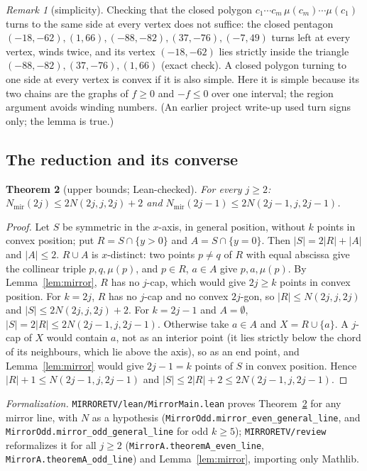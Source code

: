 \documentclass[10pt]{article}
\newtheorem{theorem}{Theorem}[section]
\theoremstyle{definition}
\theoremstyle{remark}
\newtheorem{remark}[theorem]{Remark}
\newcommand{\Nm}{N_{\mathrm{mir}}}
\newcommand{\dirn}[1]{{\upshape\nolinkurl{#1}}}
\newcommand{\lean}[1]{{\upshape\nolinkurl{#1}}}
\begin{document}
\begin{remark}[simplicity]\label{rem:simple}
Checking that the closed polygon $c_1\cdots c_m\,\mu(c_m)\cdots\mu(c_1)$ turns to the same side at every vertex does not
suffice: the closed pentagon $(-18,-62),(1,66),(-88,-82),(37,-76),(-7,49)$ turns left at every vertex, winds twice,
and its vertex $(-18,-62)$ lies strictly inside the triangle $(-88,-82),(37,-76),(1,66)$ (exact check). A closed polygon
turning to one side at every vertex is convex if it is also simple. Here it is simple because its two chains are the
graphs of $f\ge0$ and $-f\le0$ over one interval; the region argument avoids winding numbers. (An earlier project
write-up used turn signs only; the lemma is true.)
\end{remark}

\subsection{The reduction and its converse}

\begin{theorem}[upper bounds; Lean-checked]\label{thm:A}
For every $j\ge2$: $\Nm(2j)\le2N(2j,j,2j)+2$ and $\Nm(2j-1)\le2N(2j-1,j,2j-1)$.
\end{theorem}

\begin{proof}
Let $S$ be symmetric in the $x$-axis, in general position, without $k$ points in convex position; put
$R=S\cap\{y>0\}$ and $A=S\cap\{y=0\}$. Then $|S|=2|R|+|A|$ and $|A|\le2$. $R\cup A$ is $x$-distinct: two points $p\ne q$
of $R$ with equal abscissa give the collinear triple $p,q,\mu(p)$, and $p\in R$, $a\in A$ give $p,a,\mu(p)$. By
Lemma~\ref{lem:mirror}, $R$ has no $j$-cap, which would give $2j\ge k$ points in convex position. For $k=2j$, $R$ has no
$j$-cap and no convex $2j$-gon, so $|R|\le N(2j,j,2j)$ and $|S|\le2N(2j,j,2j)+2$. For $k=2j-1$ and $A=\emptyset$, $|S|=2|R|\le2N(2j-1,j,2j-1)$.
Otherwise take $a\in A$ and $X=R\cup\{a\}$. A $j$-cap of $X$ would contain $a$, not as an interior point (it lies
strictly below the chord of its neighbours, which lie above the axis), so as an end point, and Lemma~\ref{lem:mirror}
would give $2j-1=k$ points of $S$ in convex position. Hence $|R|+1\le N(2j-1,j,2j-1)$ and $|S|\le2|R|+2\le
2N(2j-1,j,2j-1)$.
\end{proof}

\noindent\emph{Formalization.} \dirn{MIRRORETV/lean/MirrorMain.lean} proves Theorem~\ref{thm:A} for any mirror line,
with $N$ as a hypothesis (\lean{MirrorOdd.mirror_even_general_line}, and \lean{MirrorOdd.mirror_odd_general_line} for
odd $k\ge5$); \dirn{MIRRORETV/review} reformalizes it for all $j\ge2$ (\lean{MirrorA.theoremA_even_line},
\lean{MirrorA.theoremA_odd_line}) and Lemma~\ref{lem:mirror}, importing only Mathlib.
\end{document}
